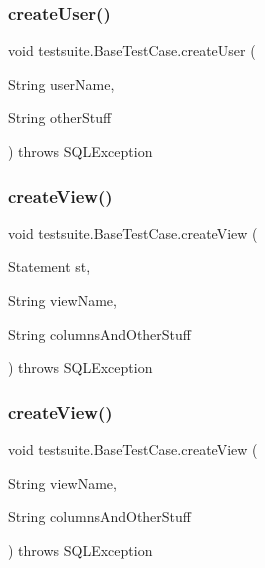 \subsubsection{\texorpdfstring{create\+User()}{createUser()}\hspace{0.1cm}{\footnotesize\ttfamily [2/2]}}
{\footnotesize\ttfamily void testsuite.\+Base\+Test\+Case.\+create\+User (\begin{DoxyParamCaption}\item[{String}]{user\+Name,  }\item[{String}]{other\+Stuff }\end{DoxyParamCaption}) throws S\+Q\+L\+Exception\hspace{0.3cm}{\ttfamily [protected]}}

\mbox{\label{classtestsuite_1_1_base_test_case_a983df40dad5ef6b021807e9e04cc72b7}} 
\subsubsection{\texorpdfstring{create\+View()}{createView()}\hspace{0.1cm}{\footnotesize\ttfamily [1/2]}}
{\footnotesize\ttfamily void testsuite.\+Base\+Test\+Case.\+create\+View (\begin{DoxyParamCaption}\item[{Statement}]{st,  }\item[{String}]{view\+Name,  }\item[{String}]{columns\+And\+Other\+Stuff }\end{DoxyParamCaption}) throws S\+Q\+L\+Exception\hspace{0.3cm}{\ttfamily [protected]}}

\mbox{\label{classtestsuite_1_1_base_test_case_a283fa00242603070d4f3b90350114b56}} 
\subsubsection{\texorpdfstring{create\+View()}{createView()}\hspace{0.1cm}{\footnotesize\ttfamily [2/2]}}
{\footnotesize\ttfamily void testsuite.\+Base\+Test\+Case.\+create\+View (\begin{DoxyParamCaption}\item[{String}]{view\+Name,  }\item[{String}]{columns\+And\+Other\+Stuff }\end{DoxyParamCaption}) throws S\+Q\+L\+Exception\hspace{0.3cm}{\ttfamily [protected]}}

